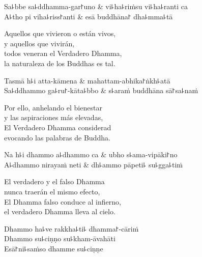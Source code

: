 \begin{twochants}
  Sa꜕bbe sa꜕ddhamma-gar꜓uno & vi꜕ha꜕riṁsu vi꜕ha꜕ranti ca \\
  A꜕tho pi viha꜕riss꜓anti & esā buddhāna꜓ dha꜕mma꜕tā \\
\end{twochants}

\begin{english}
  Aquellos que vivieron o están vivos,\\
  y aquellos que vivirán,\\
  todos veneran el Verdadero Dhamma,\\
  la naturaleza de los Buddhas es tal.
\end{english}

\begin{twochants}
  Tasmā h꜕i atta-kāmena & mahattam-abhika꜓ṅkh꜕atā \\
  Sa꜕ddhammo ga꜕ru꜓-kāta꜕bbo & s꜕araṁ buddhāna sā꜓sa꜕naṁ \\
\end{twochants}

\begin{english}
  Por ello, anhelando el bienestar\\
  y las aspiraciones más elevadas,\\
  El Verdadero Dhamma considerad\\
  evocando las palabras de Buddha.
\end{english}

\clearpage

\begin{twochants}
  Na h꜕i dhammo a꜕dhammo ca & ubho s꜕ama-vipāki꜓no \\
  A꜕dhammo nirayaṁ neti & dh꜕ammo pāpeti꜕ su꜕gga꜕tiṁ \\
\end{twochants}

\begin{english}
  El verdadero  y el falso Dhamma\\
  nunca traerán el mismo efecto,\\
  El Dhamma falso conduce al infierno,\\
  el verdadero Dhamma lleva al cielo.
\end{english}

Dhammo ha꜕ve rakkha꜕ti꜕ dhamma꜓-cāriṁ\\
Dhammo su꜕ciṇṇo su꜕kham-āvahāti\\
Esā꜓ni꜕saṁso dhamme su꜕ciṇṇe


